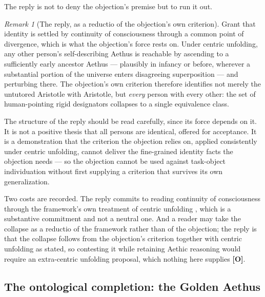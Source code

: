 \documentclass[11pt]{article}
\numberwithin{equation}{section}
\theoremstyle{plain}
\theoremstyle{definition}
\theoremstyle{remark}
\newtheorem{remark}[theorem]{Remark}
\begin{document}
The reply is not to deny the objection's premise but to run it out.

\begin{remark}[The reply, as a reductio of the objection's own criterion]
\label{to:rem:reductio}
Grant that identity is settled by continuity of consciousness through a
common point of divergence, which is what the objection's force rests
on. Under centric unfolding, any other person's self-describing Aethus
is reachable by ascending to a sufficiently early ancestor Aethus ---
plausibly in infancy or before, wherever a substantial portion of the
universe enters disagreeing superposition --- and perturbing there. The
objection's own criterion therefore identifies not merely the untutored
Aristotle with Aristotle, but \emph{every} person with every other: the
set of human-pointing rigid designators collapses to a single
equivalence class.

The structure of the reply should be read carefully, since its force
depends on it. It is not a positive thesis that all persons are
identical, offered for acceptance. It is a demonstration that the
criterion the objection relies on, applied consistently under centric
unfolding, cannot deliver the fine-grained identity facts the objection
needs --- so the objection cannot be used against task-object
individuation without first supplying a criterion that survives its own
generalization.

Two costs are recorded. The reply commits to reading continuity of
consciousness through the framework's own treatment of centric unfolding
\cite{Aethus}, which is a substantive commitment and not a neutral one.
And a reader may take the collapse as a reductio of the framework rather
than of the objection; the reply is that the collapse
follows from the objection's criterion together with centric unfolding
as stated, so contesting it while retaining Aethic reasoning would
require an extra-centric unfolding proposal, which nothing here
supplies \textbf{[O]}.
\end{remark}

\subsection{The ontological completion: the Golden Aethus}
\label{to:sub:goldenaethus}
\end{document}
